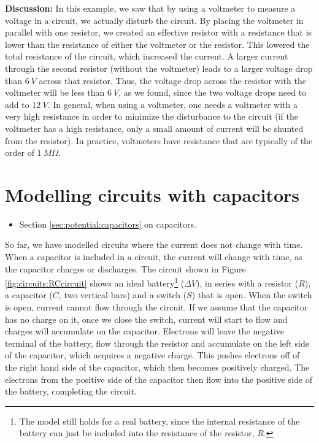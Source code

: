\begin{example}
\textbf{Discussion: }In this example, we saw that by using a voltmeter to measure a voltage in a circuit, we actually disturb the circuit. By placing the voltmeter in parallel with one resistor, we created an effective resistor with a resistance that is lower than the resistance of either the voltmeter or the resistor. This lowered the total resistance of the circuit, which increased the current. A larger current through the second resistor (without the voltmeter) leads to a larger voltage drop than $\SI{6}{V}$ across that resistor. Thus, the voltage drop across the resistor with the voltmeter will be less than $\SI{6}{V}$, as we found, since the two voltage drops need to add to $\SI{12}{V}$. In general, when using a voltmeter, one needs a voltmeter with a very high resistance in order to minimize the disturbance to the circuit (if the voltmeter has a high resistance, only a small amount of current will be shunted from the resistor). In practice, voltmeters have resistance that are typically of the order of $\SI{1}{M\Omega}$.
\end{example}

\section{Modelling circuits with capacitors}
\begin{review}
	\begin{itemize}
		\item Section \ref{sec:potential:capacitors} on capacitors.
	\end{itemize}
\end{review}
So far, we have modelled circuits where the current does not change with time. When a capacitor is included in a circuit, the current will change with time, as the capacitor charges or discharges. The circuit shown in Figure \ref{fig:circuits:RCcircuit} shows an ideal battery\footnote{The model still holds for a real battery, since the internal resistance of the battery can just be included into the resistance of the resistor, $R$.} ($\Delta V$), in series with a resistor ($R$), a capacitor ($C$, two vertical bars) and a switch ($S$) that is open. 
When the switch is open, current cannot flow through the circuit. If we assume that the capacitor has no charge on it, once we close the switch, current will start to flow and charges will accumulate on the capacitor. Electrons will leave the negative terminal of the battery, flow through the resistor and accumulate on the left side of the capacitor, which acquires a negative charge. This pushes electrons off of the right hand side of the capacitor, which then becomes positively charged. The electrons from the positive side of the capacitor then flow into the positive side of the battery, completing the circuit.

